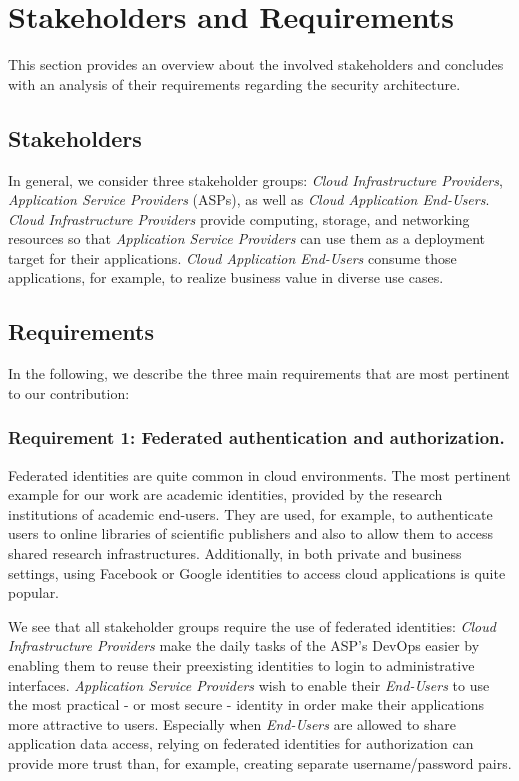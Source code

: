 \documentclass{llncs}
\begin{document}
\section{Stakeholders and Requirements}
\label{sec:requirements}

This section provides an overview about the involved stakeholders and concludes with an analysis of their requirements regarding the security architecture.

\subsection{Stakeholders}

In general, we consider three stakeholder groups: \textit{Cloud Infrastructure Providers}, \textit{Application Service Providers} (ASPs), as well as \textit{Cloud Application End-Users}. \textit{Cloud Infrastructure Providers} provide computing, storage, and networking resources so that \textit{Application Service Providers} can use them as a deployment target for their applications. \textit{Cloud Application End-Users} consume those applications, for example, to realize business value in diverse use cases.

\subsection{Requirements}

In the following, we describe the three main requirements that are most pertinent to our contribution:

\subsubsection{Requirement 1: Federated authentication and authorization.}

Federated identities are quite common in cloud environments. The most pertinent example for our work are academic identities, provided by the research institutions of academic end-users. They are used, for example, to authenticate users to online libraries of scientific publishers and also to allow them to access shared research infrastructures. Additionally, in both private and business settings, using Facebook or Google identities to access cloud applications is quite popular.

We see that all stakeholder groups require the use of federated identities: \textit{Cloud Infrastructure Providers} make the daily tasks of the ASP's DevOps easier by enabling them to reuse their preexisting identities to login to administrative interfaces. \textit{Application Service Providers} wish to enable their \textit{End-Users} to use the most practical - or most secure - identity in order make their applications more attractive to users. Especially when \textit{End-Users} are allowed to share application data access, relying on federated identities for authorization can provide more trust than, for example, creating separate username/password pairs.
\end{document}
